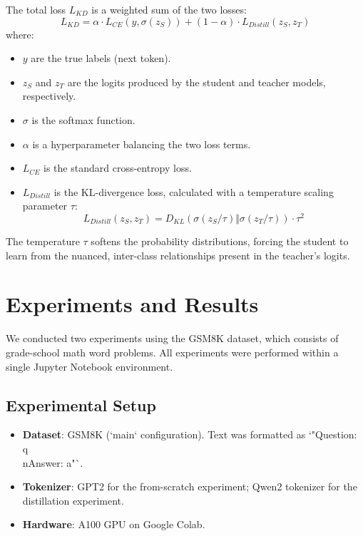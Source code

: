 \documentclass[11pt,a4paper]{article}
\begin{document}
The total loss $L_{KD}$ is a weighted sum of the two losses:
\begin{equation}
    L_{KD} = \alpha \cdot L_{CE}(y, \sigma(z_S)) + (1 - \alpha) \cdot L_{Distill}(z_S, z_T)
\end{equation}
where:
\begin{itemize}
    \item $y$ are the true labels (next token).
    \item $z_S$ and $z_T$ are the logits produced by the student and teacher models, respectively.
    \item $\sigma$ is the softmax function.
    \item $\alpha$ is a hyperparameter balancing the two loss terms.
    \item $L_{CE}$ is the standard cross-entropy loss.
    \item $L_{Distill}$ is the KL-divergence loss, calculated with a temperature scaling parameter $\tau$:
    \begin{equation}
        L_{Distill}(z_S, z_T) = D_{KL}(\sigma(z_S/\tau) \Vert \sigma(z_T/\tau)) \cdot \tau^2
    \end{equation}
\end{itemize}
The temperature $\tau$ softens the probability distributions, forcing the student to learn from the nuanced, inter-class relationships present in the teacher's logits.

\section{Experiments and Results}

We conducted two experiments using the GSM8K dataset, which consists of grade-school math word problems. All experiments were performed within a single Jupyter Notebook environment.

\subsection{Experimental Setup}
\begin{itemize}
    \item \textbf{Dataset}: GSM8K (`main` configuration). Text was formatted as `"Question: {q}\\nAnswer: {a}"`.
    \item \textbf{Tokenizer}: GPT2 for the from-scratch experiment; Qwen2 tokenizer for the distillation experiment.
    \item \textbf{Hardware}: A100 GPU on Google Colab.
\end{itemize}
\end{document}
